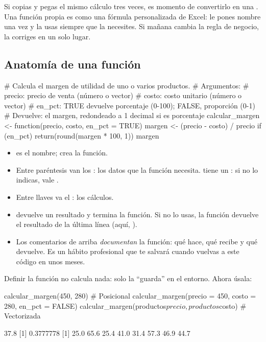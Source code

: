 Si copias y pegas el mismo cálculo tres veces, es momento de convertirlo en
una . Una función propia es como una fórmula personalizada
de Excel: le pones nombre una vez y la usas siempre que la necesites. Si
mañana cambia la regla de negocio, la corriges en un solo lugar.

\subsection{Anatomía de una función}

\begin{rcode}
# Calcula el margen de utilidad de uno o varios productos.
# Argumentos:
#   precio: precio de venta (número o vector)
#   costo:  costo unitario (número o vector)
#   en_pct: TRUE devuelve porcentaje (0-100); FALSE, proporción (0-1)
# Devuelve: el margen, redondeado a 1 decimal si es porcentaje
calcular_margen <- function(precio, costo, en_pct = TRUE) {
  margen <- (precio - costo) / precio
  if (en_pct) {
    return(round(margen * 100, 1))
  }
  margen
}
\end{rcode}

\begin{itemize}
  \item {} es el nombre;  crea la
        función.
  \item Entre paréntesis van los : los datos que la
        función necesita.  tiene un
        : si no lo indicas, vale .
  \item Entre llaves va el : los cálculos.
  \item {} devuelve un resultado y termina la función. Si no
        lo usas, la función devuelve el resultado de la última línea
        (aquí, ).
  \item Los comentarios de arriba \emph{documentan} la función: qué hace,
        qué recibe y qué devuelve. Es un hábito profesional que te salvará
        cuando vuelvas a este código en unos meses.
\end{itemize}

Definir la función no calcula nada: solo la ``guarda'' en el entorno.
Ahora úsala:

\begin{rcode}
calcular_margen(450, 280)                        # Posicional
calcular_margen(precio = 450, costo = 280, en_pct = FALSE)
calcular_margen(productos$precio, productos$costo)  # Vectorizada
\end{rcode}
\begin{rsalida}
[1] 37.8
[1] 0.3777778
[1] 25.0 65.6 25.4 41.0 31.4 57.3 46.9 44.7
\end{rsalida}

